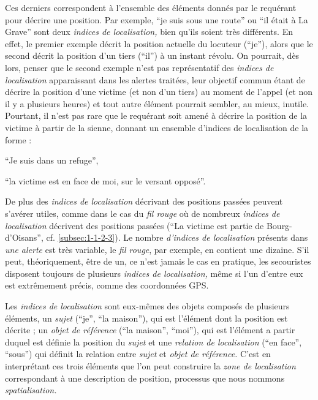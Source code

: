 Ces derniers correspondent à l'ensemble des éléments donnés par le
requérant pour décrire une position. Par exemple, \enquote{je suis
  sous une route} ou \enquote{il était à La Grave} sont deux
\emph{indices de localisation,} bien qu'ils soient très différents. En
effet, le premier exemple décrit la position actuelle du locuteur
(\enquote{je}), alors que le second décrit la position d'un tiers
(\enquote{il}) à un instant révolu. On pourrait, dès lors, penser que
le second exemple n'est pas représentatif des \emph{indices de
  localisation} apparaissant dans les alertes traitées, leur objectif
commun étant de décrire la position d'une victime (et non d'un tiers)
au moment de l'appel (et non il y a plusieurs heures) et tout autre
élément pourrait sembler, au mieux, inutile. Pourtant, il n'est pas
rare que le requérant soit amené à décrire la position de la victime à
partir de la sienne, donnant un ensemble d'indices de localisation de
la forme :
%
\begin{enumerate*}[label=\alph*)]
\item \enquote{Je suis dans un refuge},
\item \enquote{la victime est en face de moi, sur le versant opposé}.
\end{enumerate*}
% 
De plus des \emph{indices de localisation} décrivant des positions
passées peuvent s'avérer utiles, comme dans le cas du \emph{fil rouge}
où de nombreux \emph{indices de localisation} décrivent des positions
passées (\eg \enquote{La victime est partie de Bourg-d'Oisans},
cf. \autoref{subsec:1-1-2-3}). Le nombre \emph{d'indices de
  localisation} présents dans \emph{une alerte} est très variable, le
\emph{fil rouge}, par exemple, en contient une dizaine. S'il peut,
théoriquement, être de un, ce n'est jamais le cas en pratique, les
secouristes disposent toujours de plusieurs \emph{indices de
  localisation,} même si l'un d'entre eux est extrêmement précis,
comme des coordonnées GPS.
 
Les \emph{indices de localisation} sont eux-mêmes des objets composés
de plusieurs éléments, un \emph{sujet} (\enquote{je}, \enquote{la
  maison}), qui est l'élément dont la position est décrite ; un
\emph{objet de référence} (\enquote{la maison}, \enquote{moi}), qui
est l'élément a partir duquel est définie la position du \emph{sujet}
et une \emph{relation de localisation} (\enquote{en face},
\enquote{sous}) qui définit la relation entre \emph{sujet} et
\emph{objet de référence.} C'est en interprétant ces trois éléments
que l'on peut construire la \emph{zone de localisation} correspondant
à une description de position, processus que nous nommons
\emph{spatialisation.}

